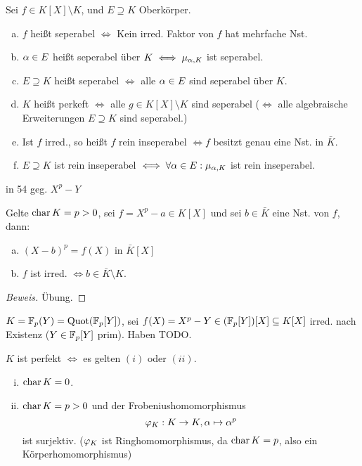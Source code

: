 \documentclass[a4paper]{report}
\begin{document}
\begin{defi}
  Sei $f \in K[X] \setminus K$, und $E \supseteq K$ Oberkörper.
  \begin{enumerate}[(a)]
    \item $f$ heißt seperabel $\iff$ Kein irred. Faktor von $f$ hat mehrfache Nst.
    \item $\alpha \in E$ heißt seperabel über $K \iff \mu_{\alpha, K}$ ist seperabel.
    \item $E \supseteq K$ heißt seperabel $\iff$ alle $\alpha \in E$ sind seperabel über $K$.
    \item $K$ heißt perkeft $\iff$ alle $g \in K[X] \setminus K$ sind seperabel ($\iff$ alle algebraische Erweiterungen $E \supseteq K$ sind seperabel.)
    \item Ist $f$ irred., so heißt $f$ rein inseperabel $\iff f$ besitzt genau eine Nst. in $\bar K$.
    \item $E \supseteq K$ ist rein inseperabel $\iff \forall \alpha \in E : \mu_{\alpha, K}$ ist rein inseperabel.
  \end{enumerate}
\end{defi}
\begin{bsp*}[zu 52(e)] in 54 geg. $X^{p} - Y$

\end{bsp*}
\begin{bsp}
  Gelte $\operatorname{char} K = p > 0$, sei $f = X^{p} - a \in K[X]$ und sei $b \in \bar K$ eine Nst. von $f$, dann:
  \begin{enumerate}[(a)]
    \item $(X - b)^{p} = f(X)$ in $\bar K[X]$
    \item $f$ ist irred. $\iff b \in \bar K \setminus K$.
  \end{enumerate}
\begin{proof}[Beweis]Übung.
\end{proof}
\end{bsp}
\begin{bsp}
$K = \mathbb{F}_p(Y) = \operatorname{Quot}(\mathbb{F}_p[Y])$, sei $f(X) = X^{p} - Y \in (\mathbb{F}_p[Y])[X] \subseteq K[X]$ irred. nach Existenz ($Y \in \mathbb{F}_p[Y]$ prim). Haben TODO.
\end{bsp}
\begin{satz}
  $K$ ist perfekt $\iff$ es gelten $(i)$ oder $(ii)$.
  \begin{enumerate}[(i)]
    \item $\operatorname{char} K = 0$.
    \item $\operatorname{char} K = p > 0$ und der Frobeniushomomorphismus \[\varphi_{K} : K \to K, \alpha \mapsto \alpha^{p}\] ist surjektiv. ($\varphi_{K}$ ist Ringhomomorphismus, da $\operatorname{char} K = p$, also ein Körperhomomorphismus)
  \end{enumerate}
\end{satz}
\end{document}
